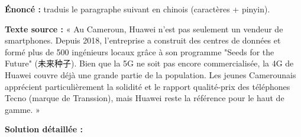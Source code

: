\documentclass[11pt]{article}
\begin{document}
\begin{exoresolu}
\textbf{Énoncé :} traduis le paragraphe suivant en chinois (caractères + pinyin).

\textbf{Texte source :}
« Au Cameroun, Huawei n'est pas seulement un vendeur de smartphones. Depuis 2018, l'entreprise a construit des centres de données et formé plus de 500 ingénieurs locaux grâce à son programme "Seeds for the Future" (未来种子). Bien que la 5G ne soit pas encore commercialisée, la 4G de Huawei couvre déjà une grande partie de la population. Les jeunes Camerounais apprécient particulièrement la solidité et le rapport qualité-prix des téléphones Tecno (marque de Transsion), mais Huawei reste la référence pour le haut de gamme. »

\tcblower
\textbf{Solution détaillée :}


\end{exoresolu}
\end{document}
